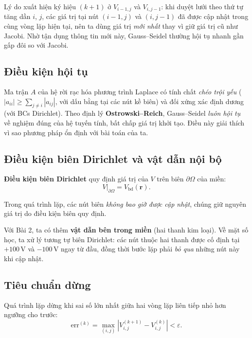 \documentclass[12pt,a4paper]{article}
\begin{document}
Lý do xuất hiện ký hiệu $(k+1)$ ở $V_{i-1,j}$ và $V_{i,j-1}$: khi duyệt lưới theo thứ tự tăng dần $i$, $j$, các giá trị tại nút $(i-1, j)$ và $(i, j-1)$ đã được cập nhật trong cùng vòng lặp hiện tại, nên ta dùng giá trị \emph{mới nhất} thay vì giữ giá trị cũ như Jacobi. Nhờ tận dụng thông tin mới này, Gauss--Seidel thường hội tụ nhanh gần gấp đôi so với Jacobi.

\subsection{Điều kiện hội tụ}

Ma trận $A$ của hệ rời rạc hóa phương trình Laplace có tính chất \emph{chéo trội yếu} ($|a_{ii}| \ge \sum_{j\neq i}|a_{ij}|$, với dấu bằng tại các nút kề biên) và đối xứng xác định dương (với BCs Dirichlet). Theo định lý \textbf{Ostrowski--Reich}, Gauss--Seidel \emph{luôn hội tụ} về nghiệm đúng của hệ tuyến tính, bất chấp giá trị khởi tạo. Điều này giải thích vì sao phương pháp ổn định với bài toán của ta.

\subsection{Điều kiện biên Dirichlet và vật dẫn nội bộ}

\textbf{Điều kiện biên Dirichlet} quy định giá trị của $V$ trên biên $\partial\Omega$ của miền:
\[
    V\big|_{\partial\Omega} = V_{\text{bd}}(\mathbf{r}).
\]

Trong quá trình lặp, các nút biên \emph{không bao giờ được cập nhật}, chúng giữ nguyên giá trị do điều kiện biên quy định.

Với Bài 2, ta có thêm \textbf{vật dẫn bên trong miền} (hai thanh kim loại). Về mặt số học, ta xử lý tương tự biên Dirichlet: các nút thuộc hai thanh được cố định tại $+100\,\mathrm{V}$ và $-100\,\mathrm{V}$ ngay từ đầu, đồng thời bước lặp phải \emph{bỏ qua} những nút này khi cập nhật.

\subsection{Tiêu chuẩn dừng}

Quá trình lặp dừng khi sai số lớn nhất giữa hai vòng lặp liên tiếp nhỏ hơn ngưỡng cho trước:
\begin{equation}
    \mathrm{err}^{(k)} = \max_{(i,j)} \left|V_{i,j}^{(k+1)} - V_{i,j}^{(k)}\right| < \varepsilon.
    \label{eq:stop}
\end{equation}
\end{document}
